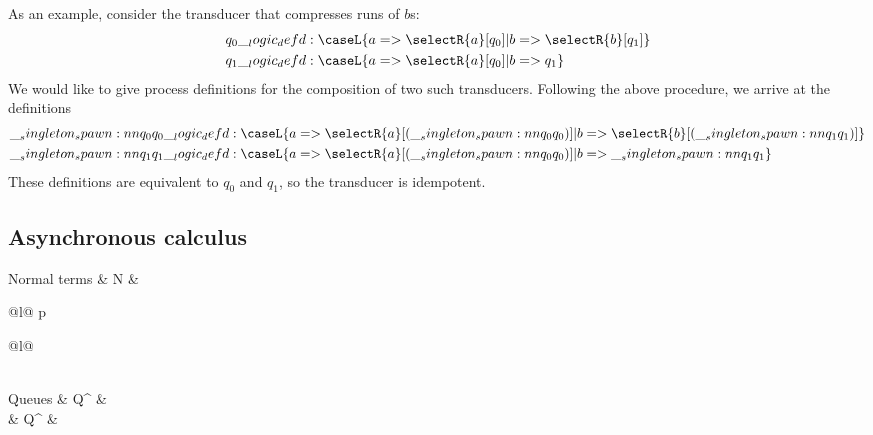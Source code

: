 As an example, consider the transducer that compresses runs of $b$s:
\begin{equation*}
  \begin{lgathered}
    q_0 \defd \caseL{a => \selectR{a}[q_0]
                   | b => \selectR{b}[q_1]}
    \\
    q_1 \defd \caseL{a => \selectR{a}[q_0]
                   | b => q_1}
  \end{lgathered}
\end{equation*}
We would like to give process definitions for the composition of two such transducers.
Following the above procedure, we arrive at the definitions
\begin{equation*}
  \begin{lgathered}
    \spawn{q_0}{q_0} \defd \caseL{a => \selectR{a}[(\spawn{q_0}{q_0})]
                                | b => \selectR{b}[(\spawn{q_1}{q_1})]}
    \\
    \spawn{q_1}{q_1} \defd \caseL{a => \selectR{a}[(\spawn{q_0}{q_0})]
                                | b => \spawn{q_1}{q_1}}
  \end{lgathered}
\end{equation*}
These definitions are equivalent to $q_0$ and $q_1$, so the transducer is idempotent.

\subsection{Asynchronous calculus}

\begin{syntax*}
  Normal terms & N &
    \begin{array}[t]{@{}l@{}}
      p \mid {} \mid {} \mid \fwd \\
        \begin{array}[t]{@{\mathllap{\mid {}}}l@{}}
           \\
        \end{array}
    \end{array}
  \\
  Q{ueues} & Q^{\plus} &
    \fwd \mid {} \mid \selectR{\kay}
  \\
           & Q^{\with} &
    \fwd \mid {} \mid \selectL{\kay}
\end{syntax*}

